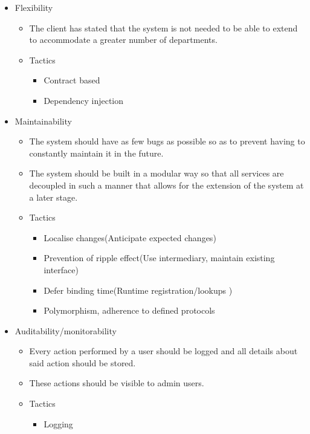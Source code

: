 \documentclass[a4paper,12pt]{article}
\begin{document}
\begin{itemize}
\begin{itemize}
\begin{itemize}
			\end{itemize}			
			
		\end{itemize}
		\item Flexibility
		\begin{itemize}
			\item The client has stated that the system is not needed to be able to extend to accommodate a greater number of departments.
			
			\item Tactics
			\begin{itemize}
				\item Contract based
				\item Dependency injection
			\end{itemize}			
			
		\end{itemize}
		\item Maintainability
		\begin{itemize}
			\item The system should have as few bugs as possible so as to prevent having to constantly maintain it in the future.
			\item The system should be built in a modular way so that all services are decoupled in such a manner that allows for the extension of the system at a later stage.
			
			\item Tactics
			\begin{itemize}
				\item Localise changes(Anticipate expected changes)
				\item Prevention of ripple effect(Use intermediary, maintain existing interface)
				\item Defer binding time(Runtime registration/lookups )
				\item Polymorphism, adherence to defined protocols
			\end{itemize}			
			
		\end{itemize}
		\item Auditability/monitorability
		\begin{itemize}
			\item Every action performed by a user should be logged and all details about said action should be stored.
			\item These actions should be visible to admin users.
			
			\item Tactics
			\begin{itemize}
				\item Logging
			\end{itemize}			
			

\end{itemize}
\end{itemize}
\end{document}
